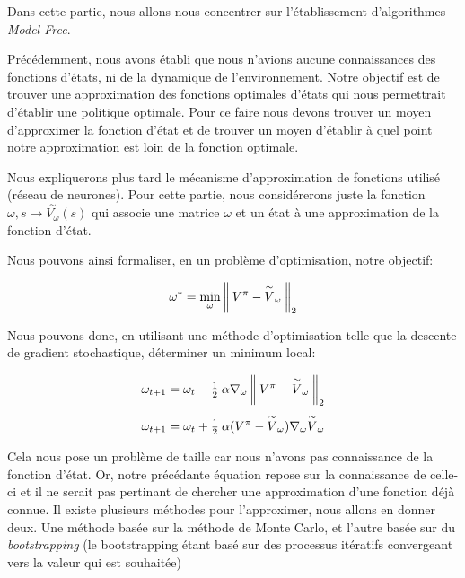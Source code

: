 Dans cette partie, nous allons nous concentrer sur l'établissement d'algorithmes \emph{Model Free}. 


Précédemment, nous avons établi que nous n'avions aucune connaissances des fonctions d'états, ni de la dynamique de l'environnement. Notre objectif est de trouver une approximation des fonctions optimales d'états qui nous permettrait d'établir une politique optimale. Pour ce faire nous devons trouver un moyen d'approximer la fonction d'état et de trouver un moyen d'établir à quel point notre approximation est loin de la fonction optimale.

Nous expliquerons plus tard le mécanisme d'approximation de fonctions utilisé (réseau de neurones). Pour cette partie, nous considérerons juste la fonction $\omega, s \rightarrow \overset{\sim}{V_\omega}(s)$ qui associe une matrice $\omega$ et un état à une approximation de la fonction d'état. 

Nous pouvons ainsi formaliser, en un problème d'optimisation, notre objectif:

$$ \omega^* = \underset{\omega}{\min} \left\lVert\: {V^\pi - \overset{\sim}{V}_\omega} \:\right\rVert_2$$

Nous pouvons donc, en utilisant une méthode d'optimisation telle que la descente de gradient stochastique, déterminer un minimum local:

\begin{equation}
\begin{aligned}
\omega_{t+1} = \omega_t - \tfrac{1}{2} \: \alpha \nabla_\omega \norm{{V^\pi - \overset{\sim}{V}_\omega}}_2 \\[0.75ex]
\omega_{t+1} = \omega_t + \tfrac{1}{2} \: \alpha (V^\pi - \overset{\sim}{V}_\omega)\nabla_\omega \overset{\sim}{V}_\omega

\end{aligned}
\end{equation}

Cela nous pose un problème de taille car nous n'avons pas connaissance de la fonction d'état. Or, notre précédante équation repose sur la connaissance de celle-ci et il ne serait pas pertinant de chercher une approximation d'une fonction déjà connue. Il existe plusieurs méthodes pour l'approximer, nous allons en donner deux. Une méthode basée sur la méthode de Monte Carlo, et l'autre basée sur du \emph{bootstrapping} (le bootstrapping étant basé sur des processus itératifs convergeant vers la valeur qui est souhaitée)

\bigskip 

